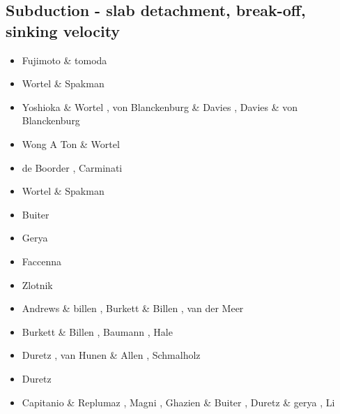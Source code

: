 \subsection{Subduction - slab detachment, break-off, sinking velocity}


\begin{scriptsize}
\begin{itemize}
\item[\nineteeneightyfive] Fujimoto \& tomoda \cite{futo85}
\item[\nineteenninetytwo] Wortel \& Spakman \cite{wosp92}
\item[\nineteenninetyfive] Yoshioka \& Wortel \cite{yowo95}, von Blanckenburg \& Davies \cite{voda95},
                           Davies \& von Blanckenburg \cite{davo95}
\item[\nineteenninetyseven] Wong A Ton \& Wortel \cite{wowo97}
\item[\nineteenninetyeight] de Boorder \etal \cite{desw98}, Carminati \etal \cite{caws98}
\item[\twothousand] Wortel \& Spakman \cite{wosp00}
\item[\twothousandtwo] Buiter \etal \cite{bugw02}
\item[\twothousandfour] Gerya \etal \cite{geym04}
\item[\twothousandsix] Faccenna \etal \cite{fabm06}
\item[\twothousandeight] Zlotnik \etal \cite{zlfd08}
\item[\twothousandnine] Andrews \& billen \cite{anbi09}, Burkett \& Billen \cite{bubi09},
                        van der Meer \etal \cite{vasv09}
\item[\twothousandten] Burkett \& Billen \cite{bubi10}, Baumann \etal \cite{bagc10},
                       Hale \etal \cite{hagr10}
\item[\twothousandeleven] Duretz \etal \cite{dugm11}, van Hunen \& Allen \cite{vaal11},
                          Schmalholz \cite{schm11}
\item[\twothousandtwelve] Duretz \etal \cite{dugk12,dusg12}
\item[\twothousandthirteen] Capitanio \& Replumaz \cite{care13}, Magni \etal \cite{mafv13},
                            Ghazien \& Buiter \cite{ghbu13}, Duretz \& gerya \cite{duge13}, 
                            Li \etal \cite{lixg13}

\end{itemize}
\end{scriptsize}
